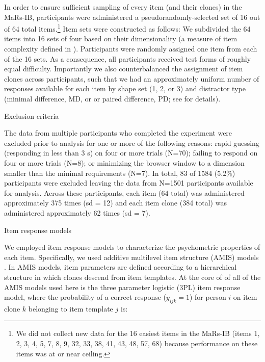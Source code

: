 \documentclass[a4paper,man,natbib]{apa6}
\makeatletter
\renewcommand{\subsubsection}{\@startsection{subsubsection}{3}
  {\z@}%
  {\b@level@two@skip}{\e@level@two@skip}%
  {\normalfont\normalsize\bfseries}}
\makeatother
\begin{document}
In order to ensure sufficient sampling of every item (and their clones) in the MaRs-IB, participants were administered a pseudorandomly-selected set of 16 out of 64 total items.\footnote{We did not collect new data for the 16 easiest items in the MaRs-IB (items 1, 2, 3, 4, 5, 7, 8, 9, 32, 33, 38, 41, 43, 48, 57, 68) because performance on these items was at or near ceiling.} Item sets were constructed as follows: We subdivided the 64 items into 16 sets of four based on their dimensionality (a measure of item complexity defined in \cite{chierchia2019matrix}). Participants were randomly assigned one item from each of the 16 sets. As a consequence, all participants received test forms of roughly equal difficulty. Importantly we also counterbalanced the assignment of item clones across participants, such that we had an approximately uniform number of responses available for each item by shape set (1, 2, or 3) and distractor type (minimal difference, MD, or or paired difference, PD; see \cite{chierchia2019matrix} for details). 

\subsubsection{Exclusion criteria}

The data from multiple participants who completed the experiment were excluded prior to analysis for one or more of the following reasons: rapid guessing (responding in less than 3 s) on four or more trials (N=70); failing to respond on four or more trials (N=8); or minimizing the browser window to a dimension smaller than the minimal requirements (N=7). In total, 83 of 1584 (5.2\%) participants were excluded leaving the data from N=1501 participants available for analysis. Across these participants, each item (64 total) was administered approximately 375 times (sd = 12) and each item clone (384 total) was administered approximately 62 times (sd = 7). 

\subsubsection{Item response models}

We employed item response models to characterize the psychometric properties of each item. Specifically, we used additive multilevel item structure (AMIS) models \citep{geerlings2011modeling, cho2014additive, lathrop2017item}. In AMIS models, item parameters are defined according to a hierarchical structure in which clones descend from item templates. At the core of of all of the AMIS models used here is the three parameter logistic (3PL) item response model, where the probability of a correct response ($y_{ijk} = 1$) for person $i$ on item clone $k$ belonging to item template $j$ is:
\end{document}
